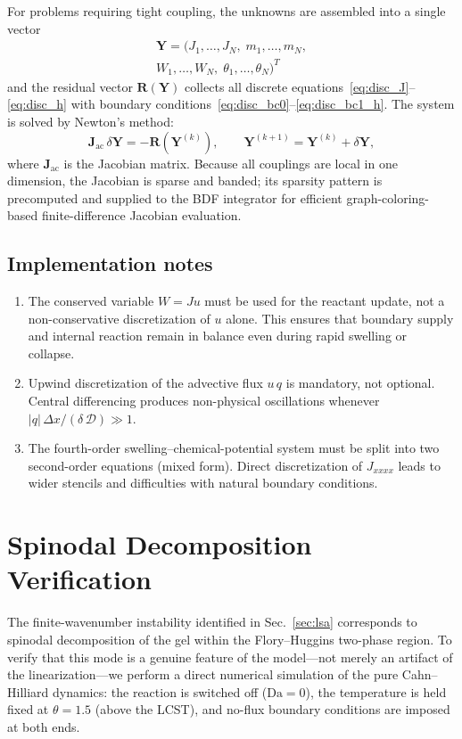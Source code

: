 \documentclass[aps,pre,reprint,superscriptaddress,longbibliography,floatfix]{revtex4-2}
\newcommand{\Ds}{\mathcal{D}}
\newcommand{\Da}{\mathrm{Da}}
\begin{document}
For problems requiring tight coupling, the unknowns are assembled
into a single vector
\begin{multline}
  \bm{Y} = (J_1,\dots,J_N,\;m_1,\dots,m_N,\\
  W_1,\dots,W_N,\;\theta_1,\dots,\theta_N)^T
\end{multline}
and the residual vector $\bm{R}(\bm{Y})$ collects all discrete equations~\eqref{eq:disc_J}--\eqref{eq:disc_h} with boundary conditions~\eqref{eq:disc_bc0}--\eqref{eq:disc_bc1_h}. The system is solved by Newton's method:
\begin{equation}
  \bm{J}_\mathrm{ac}\,\delta\bm{Y} = -\bm{R}(\bm{Y}^{(k)}),
  \qquad
  \bm{Y}^{(k+1)} = \bm{Y}^{(k)} + \delta\bm{Y},
\end{equation}
where $\bm{J}_\mathrm{ac}$ is the Jacobian matrix. Because all couplings are local in one dimension, the Jacobian is sparse and banded; its sparsity pattern is precomputed and supplied to the BDF integrator for efficient graph-coloring-based finite-difference Jacobian evaluation.

\subsection{Implementation notes}

\begin{enumerate}
  \item The conserved variable $W = Ju$ must be used for the reactant update, not a non-conservative discretization of $u$ alone. This ensures that boundary supply and internal reaction remain in balance even during rapid swelling or collapse.
  \item Upwind discretization of the advective flux $u\,q$ is mandatory, not optional. Central differencing produces non-physical oscillations whenever $|q|\,\Delta x / (\delta\,\Ds) \gg 1$.
  \item The fourth-order swelling--chemical-potential system must be split into two second-order equations (mixed form). Direct discretization of $J_{xxxx}$ leads to wider stencils and difficulties with natural boundary conditions.
\end{enumerate}


\section{Spinodal Decomposition Verification}
\label{app:spinodal}

The finite-wavenumber instability identified in
Sec.~\ref{sec:lsa} corresponds to spinodal decomposition of the gel
within the Flory--Huggins two-phase region.  To verify that this mode
is a genuine feature of the model---not merely an artifact of the
linearization---we perform a direct numerical simulation of the
pure Cahn--Hilliard dynamics: the reaction is switched off ($\Da=0$),
the temperature is held fixed at $\theta=1.5$ (above the LCST), and
no-flux boundary conditions are imposed at both ends.
\end{document}

